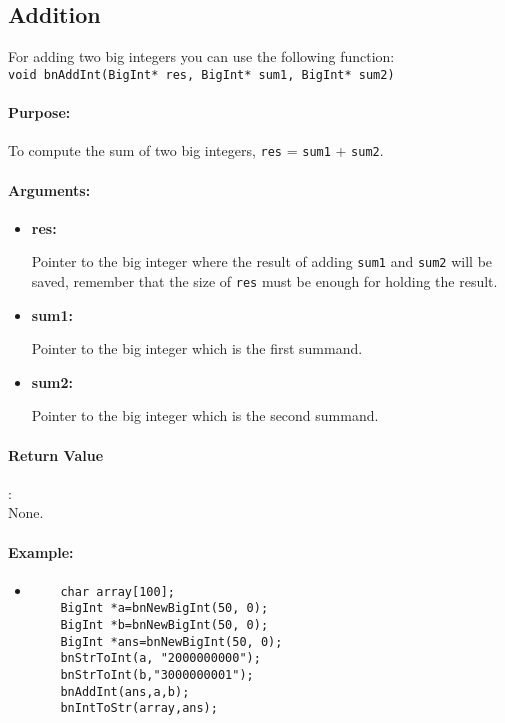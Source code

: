 \documentclass{book}
\begin{document}
\subsection{Addition}

For adding two big integers you can use the following function:\\

\verb+void bnAddInt(BigInt* res, BigInt* sum1, BigInt* sum2)+\\

\paragraph{Purpose:} 

To compute the sum of two big integers, \verb+res+ = \verb+sum1+ + \verb+sum2+.

\paragraph{Arguments:}

\begin{itemize}
\item{\bf res:}

Pointer to the big integer where the result of adding \verb+sum1+ and \verb+sum2+ will be saved, remember that the size of \verb+res+ must be enough for holding the result.

\item {\bf sum1:}

Pointer to the big integer which is the first summand.

\item {\bf sum2:}

Pointer to the big integer which is the second summand.

\end{itemize}

\paragraph{Return Value}:\\

None.

\paragraph{Example:}

\begin{itemize}
\item
\begin{verbatim}
    char array[100];
    BigInt *a=bnNewBigInt(50, 0);
    BigInt *b=bnNewBigInt(50, 0);
    BigInt *ans=bnNewBigInt(50, 0);
    bnStrToInt(a, "2000000000");
    bnStrToInt(b,"3000000001");
    bnAddInt(ans,a,b);
    bnIntToStr(array,ans);
\end{verbatim}
\end{itemize}
\end{document}

